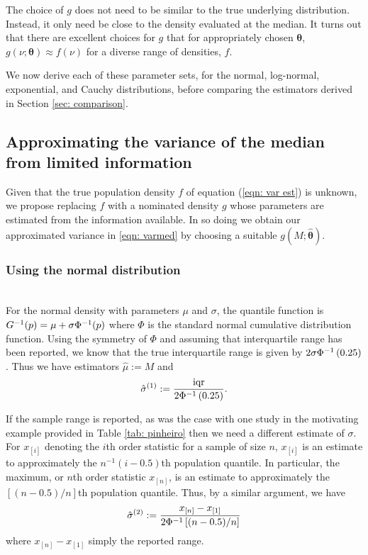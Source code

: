 \documentclass{article}
\begin{document}
\begin{remark}
The choice of $g$ does not need to be similar to the true underlying distribution.  Instead, it only need be close to the density evaluated at the median. It turns out that there are excellent choices for $g$ that for appropriately chosen $\bm{\theta}$, $g(\nu;\bm \theta)\approx f(\nu)$ for a diverse range of densities, $f$.
\end{remark}

We now derive each of these parameter sets, for the normal, log-normal, exponential, and Cauchy distributions, before comparing the estimators derived in Section \ref{sec: comparison}.

\subsection{Approximating the variance of the median from limited information}

Given that the true population density $f$ of equation (\ref{eqn: var est}) is unknown, we propose replacing $f$ with a nominated density $g$ whose parameters are estimated from the information available. In so doing we obtain our approximated variance in \eqref{eqn: varmed} by choosing a suitable $g\left(M; \hat{\bm \theta}\right)$.

\subsubsection{Using the normal distribution}\label{sect:using_norm}~\\

\noindent For the normal density with parameters $\mu$ and $\sigma$, the quantile function is $G^{-1}(p) = \mu + \sigma \Phi^{-1}(p)$ where $\Phi$ is the standard normal cumulative distribution function. Using the symmetry of $\Phi$ and assuming that interquartile range has been reported, we know that the true interquartile range is given by $2\sigma\Phi^{-1}\left(0.25 \right)$. Thus we have estimators $\hat\mu := M$ and \begin{equation*}
\hat{\sigma}^{(1)} := \frac {\operatorname{iqr}} {2 \Phi^{-1} \left ( 0.25 \right)}.
\end{equation*}

If the sample range is reported, as was the case with one study in the motivating example provided in Table \ref{tab: pinheiro} then we need a different estimate of $\sigma$. For $x_{[i]}$ denoting the $i$th order statistic for a sample of size $n$, $x_{[i]}$ is an estimate to approximately the $n^{-1}(i - 0.5)$th population quantile. In particular, the maximum, or $n$th order statistic $x_{[n]}$, is an estimate to approximately the $[(n - 0.5)/n]$th population quantile. Thus, by a similar argument, we have
\begin{equation*}
\hat{\sigma}^{(2)} := \frac {x_{[n]} - x_{[1]}} {2 \Phi^{-1} \left [ (n-0.5)/n \right]}
\end{equation*}
where $x_{[n]} - x_{[1]}$ simply the reported range.
\end{document}
